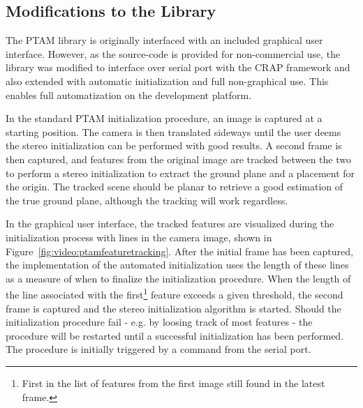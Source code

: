         \subsection{Modifications to the Library}
            The PTAM library is originally interfaced with an included graphical user interface.
            However, as the source-code is provided for non-commercial use, the
            library was modified to interface over serial port with the CRAP framework
            and also extended with automatic initialization and full non-graphical use.
            This enables full automatization on the development platform.

            In the standard PTAM initialization procedure, an image is captured
            at a starting position. The camera is then translated sideways until the user
            deems the stereo initialization can be performed with good results.
            A second frame is then captured, and features from the original image
            are tracked between the two to perform a stereo initialization to
            extract the ground plane and a placement for the origin.
            The tracked scene should be planar to retrieve a good estimation
            of the true ground plane, although the tracking will work regardless.


            In the graphical user interface, the tracked features are visualized
            during the initialization process with lines in the camera image,
            shown in Figure~\ref{fig:video:ptamfeaturetracking}.
            After the initial frame has been captured, the implementation
            of the automated initialization uses the length of these lines as
            a measure of when to finalize the initialization procedure.
            When the length of the line associated with the first\footnote{First in the list of features from the first image still found in the latest frame.}
            feature exceeds a given threshold, the second frame is
            captured and the stereo initialization algorithm is started.
            Should the initialization procedure fail - e.g. by loosing track of most features - the
            procedure will be restarted until a successful initialization has been performed.
            The procedure is initially triggered by a command from the serial port.


